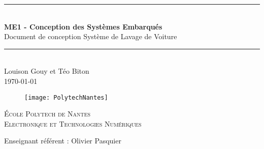 \newcommand{\HRule}{\rule{\linewidth}{0.5mm}} %

\vspace*{1cm}

\begin{center} %
	\HRule \\[0.2cm] %
	\Large
	\textbf{
		ME1 - Conception des Systèmes Embarqués
		}\\ %
	\vspace{1cm}
Document de conception Système de Lavage de Voiture \\

	\large
	\HRule \\[1.5cm] %
	\normalsize
	Louison Gouy et Téo Biton\\
	\today %
\end{center}

\begin{figure}[H] %
	\centering
	\texttt{[image: PolytechNantes]}
\end{figure}

\vspace{2cm}

\begin{center}\large %
	\textsc{École Polytech de Nantes}\\
	\textsc{Electronique et Technologies Numériques}
\end{center}

\vspace{2cm}

\noindent
Enseignant référent : Olivier Pasquier
\vspace{2cm}
